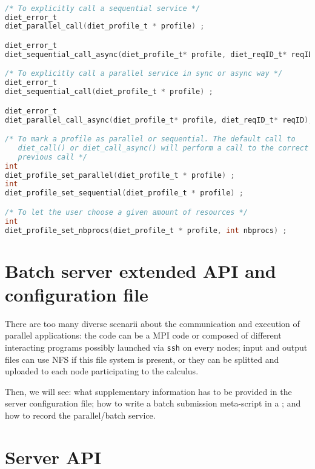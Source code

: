 \begin{lstlisting}[language=c,basewidth={.5em,.4em},fontadjust]

/* To explicitly call a sequential service */
diet_error_t
diet_parallel_call(diet_profile_t * profile) ;

diet_error_t
diet_sequential_call_async(diet_profile_t* profile, diet_reqID_t* reqID);

/* To explicitly call a parallel service in sync or async way */
diet_error_t
diet_sequential_call(diet_profile_t * profile) ;

diet_error_t
diet_parallel_call_async(diet_profile_t* profile, diet_reqID_t* reqID);

/* To mark a profile as parallel or sequential. The default call to 
   diet_call() or diet_call_async() will perform a call to the correct
   previous call */
int
diet_profile_set_parallel(diet_profile_t * profile) ;
int
diet_profile_set_sequential(diet_profile_t * profile) ;

/* To let the user choose a given amount of resources */ 
int
diet_profile_set_nbprocs(diet_profile_t * profile, int nbprocs) ;

\end{lstlisting}

\section{Batch server extended API and configuration file}

There are too many diverse scenarii about the communication and execution of
parallel applications: the code can be a MPI code or composed of different
interacting programs possibly launched via \verb!ssh! on every nodes; input and
output files can use NFS if this file system is present, or they can be
splitted and uploaded to each node participating to the calculus.

Then, we will see: what supplementary information has to be provided
in the server configuration file; how to write a batch submission
meta-script in a \sed; and how to record the parallel/batch service.

\section{Server API}

